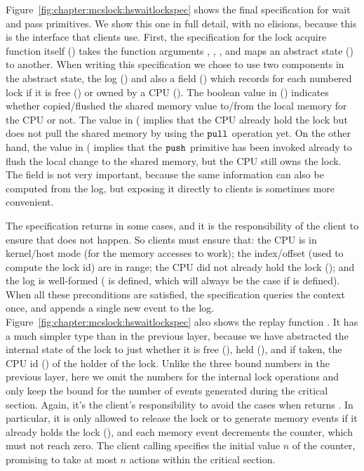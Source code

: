 Figure~\ref{fig:chapter:mcslock:hswaitlockspec} shows the final specification for 
wait and pass primitives. We show this one in full detail, with no elisions,
because this is the interface that clients use. First, the
specification for the lock acquire function itself
() takes the function arguments
, , , and maps an
abstract state () to another. When writing this
specification we chose to use two components in the abstract state, the
log () and also a field () which
records for each numbered lock if it is free ()
or owned by a CPU (). 
The boolean value in () indicates whether copied/flushed the shared memory value to/from the local memory for the CPU or not.
The  value in ( implies that the CPU already hold the lock but does not pull the shared memory by using the ${\mathrm{\texttt{pull}}}$ operation yet. 
On the other hand, the   value   in ( implies that the ${\mathrm{\texttt{push}}}$ primitive has been invoked already 
to flush the local change to the shared memory, but the CPU still owns the lock.
The  field is
not very important, because the same information can also be computed
from the log, but exposing it directly to clients is sometimes more
convenient.

The specification returns  in some
cases, and it is the
responsibility of the client to ensure  that does not
happen. So clients must ensure that: the CPU is in kernel/host
mode (for the memory accesses to work); the index/offset (used to
compute the lock id) are in range; the CPU did not already hold the
lock (); and the log is well-formed
( is defined, which will always be the case if
 is defined).  When all these preconditions are
satisfied, the specification queries the context once, and appends a
single new  event to the log.
Figure~\ref{fig:chapter:mcslock:hswaitlockspec} also shows the replay function
.
It has a much simpler type than  in the
previous layer, because we have abstracted the internal state of the lock
to just whether it is free (),
held (), and if taken, the CPU id ()
of the holder of the lock. Unlike the three bound numbers in the
previous layer, here we omit the numbers for the internal lock
operations and only keep the bound  for the number
of events generated during the critical section. Again, it's the
client's responsibility to avoid the cases when 
returns . In particular, it is only allowed to release
the lock or to generate memory events if it already holds the lock
(), and each memory event decrements the counter,
which must not reach zero. The client calling 
specifies the initial value $n$ of the counter, promising to take at
most $n$ actions within the critical section.


